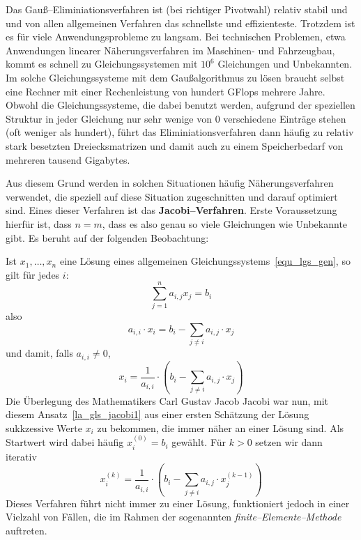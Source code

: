\begin{notiz}
Das Gauß--Eliminiationsverfahren ist (bei richtiger Pivotwahl) relativ stabil und und von allen allgemeinen Verfahren das 
schnellste und effizienteste. Trotzdem ist es für viele Anwendungsprobleme zu langsam. Bei technischen Problemen, 
etwa Anwendungen linearer Näherungsverfahren im Maschinen- und Fahrzeugbau, kommt es schnell zu 
Gleichungssystemen mit $10^6$ Gleichungen und Unbekannten. Im solche Gleichungssysteme mit dem 
Gaußalgorithmus zu lösen braucht selbst eine Rechner mit einer Rechenleistung von hundert GFlops mehrere Jahre. 
Obwohl die Gleichungssysteme, die dabei benutzt werden, aufgrund der speziellen Struktur in jeder Gleichung nur 
sehr wenige von $0$ verschiedene Einträge stehen (oft weniger als hundert), führt das Eliminiationsverfahren dann 
häufig zu relativ stark besetzten Dreiecksmatrizen und damit auch zu einem Speicherbedarf von mehreren tausend 
Gigabytes.   

Aus diesem Grund werden in solchen Situationen häufig Näherungsverfahren verwendet, die speziell auf diese Situation 
zugeschnitten und darauf optimiert sind. Eines dieser Verfahren ist das \textbf{Jacobi--Verfahren}. Erste Voraussetzung 
hierfür ist, dass $n = m$, dass es also genau so viele Gleichungen wie Unbekannte gibt. Es beruht auf der 
folgenden Beobachtung: 

Ist $x_1, \ldots, x_n$ eine Lösung eines allgemeinen Gleichungssystems~\eqref{equ_lgs_gen}, so gilt für jedes $i$: 
	$$ \sum\limits_{j=1}^n a_{i,j} x_j = b_i $$
also 
	$$ a_{i,i} \cdot x_i = b_i - \sum\limits_{j \neq i} a_{i,j} \cdot x_j $$
und damit, falls $a_{i,i} \neq 0$, 
	\begin{equation}\label{la_gls_jacobi1}
	x_i = \frac {1}{a_{i,i}} \cdot \left( b_i -  \sum\limits_{j \neq i} a_{i,j} \cdot x_j \right) 
	\end{equation}
Die Überlegung des Mathematikers Carl Gustav Jacob Jacobi war nun, mit diesem Ansatz~\eqref{la_gls_jacobi1} aus 
einer ersten Schätzung 
der Lösung sukkzessive Werte $x_i$ zu bekommen, die immer näher an einer Lösung sind. Als Startwert wird dabei 
häufig $x_i^{(0)} = b_i$ gewählt. Für $k > 0$ setzen wir dann iterativ
	\begin{equation}\label{la_gls_jacobi2} 
	x^{(k)}_i =  \frac {1}{a_{i,i}} \cdot \left( b_i -  \sum\limits_{j \neq i} a_{i,j} \cdot x^{(k-1)}_j \right) 
	\end{equation}
Dieses Verfahren führt nicht immer zu einer Lösung, funktioniert jedoch in einer Vielzahl von Fällen, die im Rahmen der 
sogenannten \textit{finite--Elemente--Methode} auftreten.  
\end{notiz}

